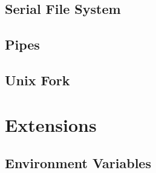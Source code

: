 \documentclass[logo,bsc,singlespacing,parskip]{infthesis}
\begin{document}
\section{Serial File System}

\section{Pipes}

\section{Unix Fork}

\chapter{Extensions}

\section{Environment Variables}
\end{document}
